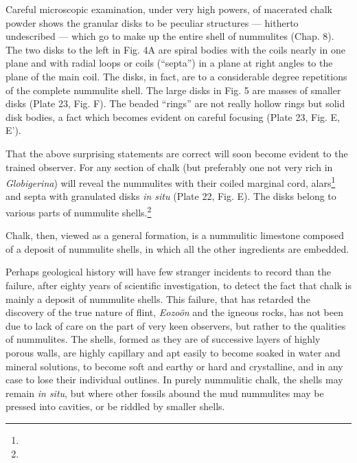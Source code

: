 \documentclass[a4paper, 12pt, oneside]{article}
\begin{document}
Careful microscopic examination, under very high powers, of macerated chalk powder shows the granular disks to be peculiar structures --- hitherto undescribed --- which go to make up the entire shell of nummulites (Chap. 8). The two disks to the left in Fig. 4A are spiral bodies with the coils nearly in one plane and with radial loops or coils (``septa'') in a plane at right angles to the plane of the main coil. The disks, in fact, are to a considerable degree repetitions of the complete nummulite shell. The large disks in Fig. 5 are masses of smaller disks (Plate 23, Fig. F). The beaded ``rings'' are not really hollow rings but solid disk bodies, a fact which becomes evident on careful focusing (Plate 23, Fig. E, E').

That the above surprising statements are correct will soon become evident to the trained observer. For any section of chalk (but preferably one not very rich in \emph{Globigerina}) will reveal the nummulites with their coiled marginal cord, alars\footnote{} and septa with granulated disks \emph{in situ} (Plate 22, Fig. E). The disks belong to various parts of nummulite shells.\footnote{}

Chalk, then, viewed as a general formation, is a nummulitic limestone composed of a deposit of nummulite shells, in which all the other ingredients are embedded.

Perhaps geological history will have few stranger incidents to record than the failure, after eighty years of scientific investigation, to detect the fact that chalk is mainly a deposit of nummulite shells. This failure, that has retarded the discovery of the true nature of flint, \emph{Eozoön} and the igneous rocks, has not been due to lack of care on the part of very keen observers, but rather to the qualities of nummulites. The shells, formed as they are of successive layers of highly porous walls, are highly capillary and apt easily to become soaked in water and mineral solutions, to become soft and earthy or hard and crystalline, and in any case to lose their individual outlines. In purely nummulitic chalk, the shells may remain \emph{in situ}, but where other fossils abound the mud nummulites may be pressed into cavities, or be riddled by smaller shells.
\end{document}
